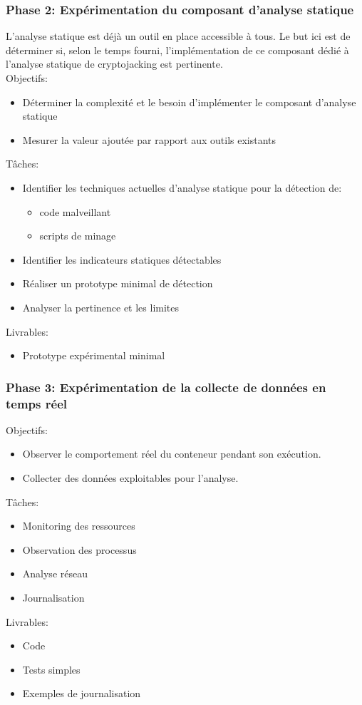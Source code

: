 \subsubsection{Phase 2: Expérimentation du composant d'analyse statique}
L'analyse statique est déjà un outil en place accessible à tous. Le but ici est de déterminer si, selon le temps fourni, l'implémentation de ce composant dédié à l'analyse statique de cryptojacking est pertinente. \\
\newline
Objectifs:
\begin{itemize}
    \item Déterminer la complexité et le besoin d'implémenter le composant d'analyse statique
    \item Mesurer la valeur ajoutée par rapport aux outils existants
\end{itemize}
Tâches:
\begin{itemize}
    \item Identifier les techniques actuelles d'analyse statique pour la détection de:
    \begin{itemize}
        \item code malveillant
        \item scripts de minage
    \end{itemize}
    \item Identifier les indicateurs statiques détectables
    \item Réaliser un prototype minimal de détection
    \item Analyser la pertinence et les limites
\end{itemize}
Livrables:
\begin{itemize}
    \item Prototype expérimental minimal
\end{itemize}

\subsubsection{Phase 3: Expérimentation de la collecte de données en temps réel}
Objectifs:
\begin{itemize}
    \item Observer le comportement réel du conteneur pendant son exécution.
    \item Collecter des données exploitables pour l'analyse.
\end{itemize}
Tâches:
\begin{itemize}
    \item Monitoring des ressources
    \item Observation des processus
    \item Analyse réseau
    \item Journalisation
\end{itemize}
Livrables:
\begin{itemize}
    \item Code
    \item Tests simples
    \item Exemples de journalisation
\end{itemize}

